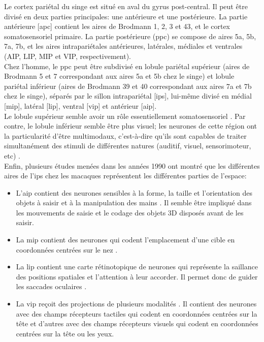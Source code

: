 Le cortex pariétal du singe est situé en aval du gyrus post-central. Il peut être divisé en deux parties principales: une antérieure et une postérieure. La partie antérieure [\gls{apc}] contient les aires de Brodmann 1, 2, 3 et 43, et le cortex somatosensoriel primaire. La partie postérieure (\gls{ppc}) se compose de aires 5a, 5b, 7a, 7b, et les aires intrapariétales antérieures, latérales, médiales et ventrales (AIP, LIP, MIP et VIP, respectivement).\\

Chez l'homme, le \gls{ppc} peut être subdivisé en lobule pariétal supérieur (aires de Brodmann 5 et 7 correspondant aux aires 5a et 5b chez le singe) et lobule pariétal inférieur (aires de Brodmann 39 et 40 correspondant aux aires 7a et 7b chez le singe), séparés par le sillon intrapariétal [\gls{ips}], lui-même divisé en médial [\gls{mip}], latéral [\gls{lip}], ventral [\gls{vip}] et antérieur [\gls{aip}].\\

Le lobule supérieur semble avoir un rôle essentiellement somatosensoriel \cite{Rizzolatti:1997}. Par contre, le lobule inférieur semble être plus visuel; les neurones de cette région ont la particularité d'être multimodaux, c'est-à-dire qu'ils sont capables de traiter simultanément des stimuli de différentes natures (auditif, visuel, sensorimoteur, etc) \cite{DeRenzi:1982, Rizzolatti:1997}.\\



Enfin, plusieurs études menées dans les années 1990 ont montré que les différentes aires de l'\gls{ips} chez les macaques représentent les différentes parties de l'espace:
\begin{itemize}
\item L'\gls{aip} contient des neurones sensibles à la forme, la taille et l'orientation des objets à saisir \cite{Murata:2000} et à la manipulation des mains \cite{Fogassi:2005}. Il semble être impliqué dans les mouvements de saisie et le codage des objets 3D disposés avant de les saisir.
\item La \gls{mip} contient des neurones qui codent l'emplacement d'une cible en coordonnées  centrées sur le nez \cite{Pesaran:2006}.
\item La \gls{lip} contient une carte rétinotopique \cite{Kusunoki:2003} de neurones  qui représente la saillance des positions spatiales et l'attention à leur accorder. Il permet donc de guider les saccades oculaires \cite{Goldberg:2006}.
\item La \gls{vip} reçoit des projections de plusieurs modalités \cite{Avillac:2005}. Il contient des neurones avec des champs récepteurs tactiles qui codent en coordonnées centrées sur la tête et d'autres avec des champs récepteurs visuels qui codent en coordonnées centrées sur la tête ou les yeux.\\
\end{itemize}

